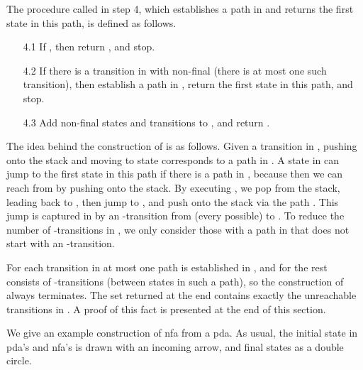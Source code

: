 \documentclass{llncs}
\begin{document}
The procedure called in step 4, which establishes a path  in 
and returns the first state in this path, is defined as follows.
\begin{itemize}
\item[4.1]
If , then return , and stop.\vspace{1mm}
\item[4.2]
If there is a transition  in  with  non-final (there is at most one such transition),
then establish a path  in , return the first state in this path, and stop.\vspace{1mm}
\item[4.3]
Add non-final states  and transitions  to ,
and return .
\end{itemize}

The idea behind the construction of  is as follows. Given a transition
 in , pushing  onto the stack and moving to state 
corresponds to a path  in . A state  in  can jump
to the first state in this path if there is a path  in ,
because then we can reach  from  by pushing  onto the stack.
By executing , we pop  from the stack, leading back to , then jump to , and push  onto the stack
via the path .
This jump is captured in  by an -transition from (every possible)  to .
To reduce the number of -transitions in , we only consider those  with a path 
in  that does not start with an -transition.

For each transition in  at most one path is established in , and for the rest  consists of
-transitions (between states in such a path), so the construction of  always terminates.
The set  returned at the end contains exactly the unreachable transitions in .
A proof of this fact is presented at the end of this section.

We give an example construction of nfa  from a pda.
As usual, the initial state in pda's and nfa's is drawn with an incoming arrow, and final states as a double circle.
\end{document}
